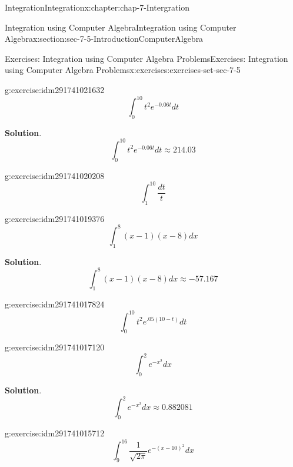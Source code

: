\documentclass[oneside,10pt,]{book}
\numberwithin{equation}{section}
\begin{document}
\begin{chapterptx}{Integration}{}{Integration}{}{}{x:chapter:chap-7-Intergration}
\begin{sectionptx}{Integration using Computer Algebra}{}{Integration using Computer Algebra}{}{}{x:section:sec-7-5-IntroductionComputerAlgebra}
\begin{exercises-subsection}{Exercises: Integration using Computer Algebra Problems}{}{Exercises: Integration using Computer Algebra Problems}{}{}{x:exercises:exercises-set-sec-7-5}
\begin{divisionexercise}{11}{}{}{g:exercise:idm291741021632}
%
\begin{equation*}
\int_0^{10} t^2 e^{-0.06t}  dt 
\end{equation*}
\par\smallskip%
\noindent\textbf{Solution}.\hypertarget{g:solution:idm291741021072}{}\quad{}%
\begin{equation*}
\int_0^{10} t^2 e^{-0.06t}  dt \approx 214.03
\end{equation*}
\end{divisionexercise}%
\begin{divisionexercise}{12}{}{}{g:exercise:idm291741020208}%
%
\begin{equation*}
\int_1^{10}\frac{dt}{t} 
\end{equation*}
\end{divisionexercise}%
\begin{divisionexercise}{13}{}{}{g:exercise:idm291741019376}%
%
\begin{equation*}
\int_1^8(x-1)(x-8)  dx
\end{equation*}
\par\smallskip%
\noindent\textbf{Solution}.\hypertarget{g:solution:idm291741018688}{}\quad{}%
\begin{equation*}
\int_1^8(x-1)(x-8)  dx \approx -57.167
\end{equation*}
\end{divisionexercise}%
\begin{divisionexercise}{14}{}{}{g:exercise:idm291741017824}%
%
\begin{equation*}
\int_0^{10}t^2 e^{.05(10-t)}  dt 
\end{equation*}
\end{divisionexercise}%
\begin{divisionexercise}{15}{}{}{g:exercise:idm291741017120}%
%
\begin{equation*}
\int_0^2 e^{-x^2} dx
\end{equation*}
\par\smallskip%
\noindent\textbf{Solution}.\hypertarget{g:solution:idm291741016576}{}\quad{}%
\begin{equation*}
\int_0^2 e^{-x^2} dx \approx 0.882081
\end{equation*}
\end{divisionexercise}%
\begin{divisionexercise}{16}{}{}{g:exercise:idm291741015712}%
%
\begin{equation*}
\int_9^{16} \frac{1}{\sqrt{2\pi}} e^{-(x-10)^2}  dx 
\end{equation*}
\end{divisionexercise}%

\end{exercises-subsection}
\end{sectionptx}
\end{chapterptx}
\end{document}
